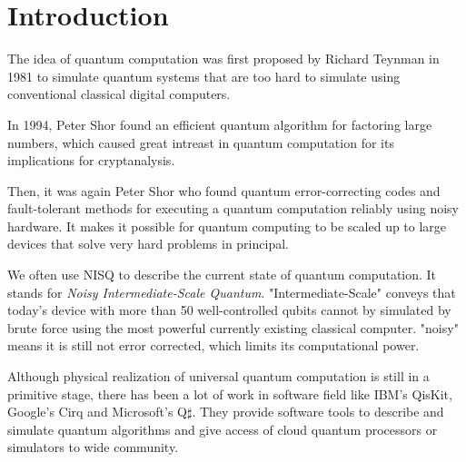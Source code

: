 \section{Introduction}
The idea of quantum computation was first proposed by Richard Teynman in 1981 to simulate quantum systems that are too hard to simulate using conventional classical digital computers.

In 1994, Peter Shor found an efficient quantum algorithm for factoring large numbers, which caused great intreast in quantum computation for its implications for cryptanalysis.

Then, it was again Peter Shor who found quantum error-correcting codes and fault-tolerant methods for executing a quantum computation reliably using noisy hardware. It makes it possible for quantum computing to be scaled up to large devices that solve very hard problems in principal.

We often use NISQ to describe the current state of quantum computation. It stands for \textit{Noisy Intermediate-Scale Quantum}. "Intermediate-Scale" conveys that today's device with more than 50 well-controlled qubits cannot by simulated by brute force using the most powerful currently existing classical computer.
"noisy" means it is still not error corrected, which limits its computational power.



Although physical realization of universal quantum computation is still in a primitive stage, there has been a lot of work in software field like IBM's QisKit, Google's Cirq and Microsoft's Q$\sharp$.
They provide software tools to describe and simulate quantum algorithms and give access of cloud quantum processors or simulators to wide community.

